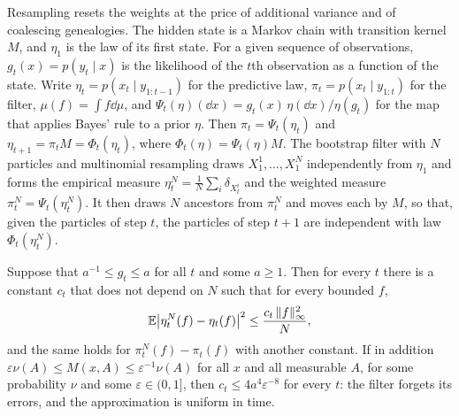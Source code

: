 Resampling resets the weights at the price of additional variance and of coalescing genealogies. The hidden state is a Markov chain with transition kernel $M$, and $\eta_1$ is the law of its first state. For a given sequence of observations, $g_t(x) = p(y_t\mid x)$ is the likelihood of the $t$th observation as a function of the state. Write $\eta_t = p(x_t\mid y_{1:t-1})$ for the predictive law, $\pi_t = p(x_t\mid y_{1:t})$ for the filter, $\mu(f) = \int f\dd\mu$, and $\Psi_t(\eta)(\dd x) = g_t(x)\,\eta(\dd x)/\eta(g_t)$ for the map that applies Bayes' rule to a prior $\eta$. Then $\pi_t = \Psi_t(\eta_t)$ and $\eta_{t+1} = \pi_tM = \Phi_t(\eta_t)$, where $\Phi_t(\eta) = \Psi_t(\eta)M$. The bootstrap filter with $N$ particles and multinomial resampling draws $X^1_1,\dots,X^N_1$ independently from $\eta_1$ and forms the empirical measure $\eta^N_t = \frac1N\sum_i\delta_{X^i_t}$ and the weighted measure $\pi^N_t = \Psi_t(\eta^N_t)$. It then draws $N$ ancestors from $\pi^N_t$ and moves each by $M$, so that, given the particles of step $t$, the particles of step $t+1$ are independent with law $\Phi_t(\eta^N_t)$.

\begin{theorem}
\label{thm:pf_error}
Suppose that $a^{-1}\leq g_t\leq a$ for all $t$ and some $a\geq1$. Then for every $t$ there is a constant $c_t$ that does not depend on $N$ such that for every bounded $f$,
\[
\mathbb{E}\big|\eta_t^N(f)-\eta_t(f)\big|^2\leq\frac{c_t\,\|f\|_\infty^2}{N},
\]
and the same holds for $\pi_t^N(f)-\pi_t(f)$ with another constant. If in addition $\varepsilon\nu(A)\leq M(x,A)\leq\varepsilon^{-1}\nu(A)$ for all $x$ and all measurable $A$, for some probability $\nu$ and some $\varepsilon\in(0,1]$, then $c_t\leq4a^4\varepsilon^{-8}$ for every $t$: the filter forgets its errors, and the approximation is uniform in time.
\end{theorem}

